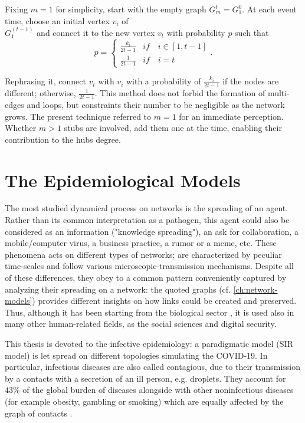 \documentclass[a4paper,10pt,twoside]{book} %
\theoremstyle{definition}
\begin{document}
Fixing $m=1$ for simplicity, start with the empty graph $G_{m}^t = G_1^0$.
At each event time, choose an initial vertex $v_i$ of \\ $G_1^{(t-1)}$ and connect it to the new vertex $v_t$ with probability $p$ such that
\begin{equation}
	p =
	\begin{cases}
		\frac{k_i}{2t-1} & if \quad i \in [1,t-1] \\
		\frac{1}{2t-1} & if \quad i = t
	\end{cases}
	.
\end{equation}

Rephrasing it, connect $v_t$ with $v_i$ with a probability of $\frac{k_i}{2t-1}$ if the nodes are different; otherwise, $\frac{1}{2t-1}$. This method does not forbid the formation of multi-edges and loops, but constraints their number to be negligible as the network grows.
The present technique referred to $m=1$ for an immediate perception. Whether $m > 1$ stubs are involved, add them one at the time, enabling their contribution to the hubs degree.

\chapter{The Epidemiological Models}
\label{ch:sir-models}	
The most studied dynamical process on networks is the spreading of an agent. Rather than its common interpretation as a pathogen, this agent could also be considered as an information ("knowledge spreading"), an ask for collaboration, a mobile/computer virus, a business practice, a rumor or a meme, etc. These phenomena acts on different types of networks; are characterized by peculiar time-scales and follow various microscopic-transmission mechanisms. Despite all of these differences, they obey to a common pattern conveniently captured by analyzing their spreading on a network: the quoted graphs (cf. \autoref{ch:network-models}) provides different insights on how links could be created and preserved. Thus, although it has been starting from the biological sector \cite{VespignaniSatorras2001Epidemic}, it is used also in many other human-related fields, as the social sciences and digital security.

This thesis is devoted to the infective epidemiology: a paradigmatic model (SIR model) is let spread on different topologies simulating the COVID-19. In particular, infectious diseases are also called contagious, due to their transmission by a contacts with a secretion of an ill person, e.g. droplets. They account for $43\%$ of the global burden of diseases alongside with other noninfectious diseases (for example obesity, gambling or smoking) which are equally affected by the graph of contacts \cite{barabasi::2016networkbook}.
\end{document}
